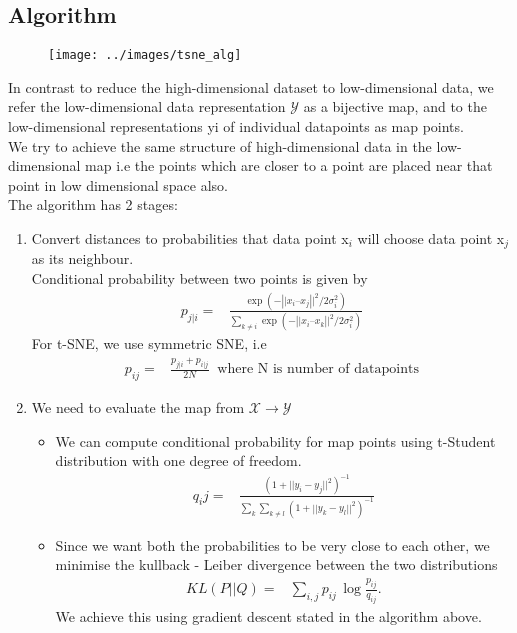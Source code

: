 \documentclass[12pt,letterpaper, onecolumn]{exam}
\begin{document}
\subsection*{Algorithm}
\begin{figure}[!h]
\centering
\texttt{[image: ../images/tsne\_alg]}
\end{figure}

In contrast to reduce the high-dimensional dataset to low-dimensional data, we refer the low-dimensional data representation $\mathcal{Y}$ as a bijective map, and to the low-dimensional representations yi of individual datapoints as map points.\\
We try to achieve the same structure of high-dimensional data in the low-dimensional map i.e the points which are closer to a point are placed near that point in low dimensional space also.\\
The algorithm has 2 stages:
\begin{enumerate}
\item Convert distances to probabilities that data point x$_i$ will choose data point x$_j$ as its neighbour.
\\ Conditional probability between two points is given by
\begin{align}
p_{j|i} ={}& \frac{\exp\left(-\left|| x_i – x_j\right||^2 \big/ 2\sigma_i^2\right)}{\displaystyle\sum_{k \neq i} \exp\left(-\left|| x_i – x_k\right||^2 \big/ 2\sigma_i^2\right)}
\end{align}
For t-SNE, we use symmetric SNE, i.e
\begin{align}
p_{ij} = {}& \frac{p_{j|i} + p_{i|j}}{2N} \;  \; \text{where N is number of datapoints}
\end{align}
\item We need to evaluate the map from $\mathcal{X} \rightarrow \mathcal{Y}$
\begin{itemize}
\item We can compute conditional probability for map points using t-Student distribution with one degree of freedom.
\begin{align}
q_ij = {}& \frac{(1+ ||y_i - y_j||^2)^{-1}}{\sum_{k} \sum_{k \neq l} (1+ ||y_k - y_l||^2)^{-1}}
\end{align}
\item Since we want both the probabilities to be very close to each other, we minimise the kullback - Leiber divergence between the two distributions
\begin{align}
KL(P||Q) ={}& \sum_{i, j} p_{ij} \, \log \frac{p_{ij}}{q_{ij}}.
\end{align}
We achieve this using gradient descent stated in the algorithm above.
\end{itemize}
\end{enumerate}
\end{document}
